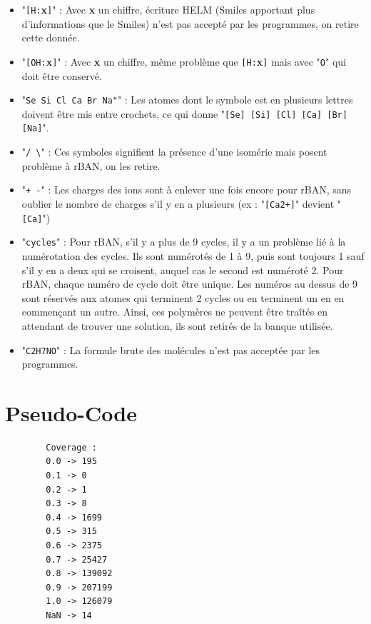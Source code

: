 \documentclass[11pt, a4paper]{report}
\begin{document}
\begin{itemize}
		\item "\verb|[H:|\textbf{x}\verb|]|" : Avec \textbf{x} un chiffre, écriture HELM (Smiles apportant plus d'informations que le Smiles) n'est pas accepté par les programmes, on retire cette donnée.
		
		\item "\verb|[OH:|\textbf{x}\verb|]|" : Avec \textbf{x} un chiffre, même problème que \verb|[H:|\textbf{x}\verb|]| mais avec "\verb|O|" qui doit être conservé.
		
		\item "\verb|Se Si Cl Ca Br Na"|" : Les atomes dont le symbole est en plusieurs lettres doivent être mis entre crochets, ce qui donne "\verb|[Se] [Si] [Cl] [Ca] [Br] [Na]|".
		
		\item "\verb|/ \|" : Ces symboles signifient la présence d'une isomérie mais posent problème à rBAN, on les retire.
		
		\item "\verb|+ -|" : Les charges des ions sont à enlever une fois encore pour rBAN, sans oublier le nombre de charges s'il y en a plusieurs (ex : "\verb|[Ca2+]|" devient "\verb|[Ca]|")
		
		\item "\verb|cycles|" : Pour rBAN, s'il y a plus de 9 cycles, il y a un problème lié à la numérotation des cycles. Ils sont numérotés de 1 à 9, puis sont toujours 1 sauf s'il y en a deux qui se croisent, auquel cas le second est numéroté 2. Pour rBAN, chaque numéro de cycle doit être unique. Les numéros au dessus de 9 sont réservés aux atomes qui terminent 2 cycles ou en terminent un en en commençant un autre. Ainsi, ces polymères ne peuvent être traîtés en attendant de trouver une solution, ils sont retirés de la banque utilisée.
		
		\item "\verb|C2H7NO|" : La formule brute des molécules n'est pas acceptée par les programmes.
	\end{itemize}

	\chapter{Pseudo-Code}
	\begin{lstlisting}
		Coverage :
		0.0 -> 195
		0.1 -> 0
		0.2 -> 1
		0.3 -> 8
		0.4 -> 1699
		0.5 -> 315
		0.6 -> 2375
		0.7 -> 25427
		0.8 -> 139092
		0.9 -> 207199
		1.0 -> 126079
		NaN -> 14
	\end{lstlisting}
	
\end{document}
